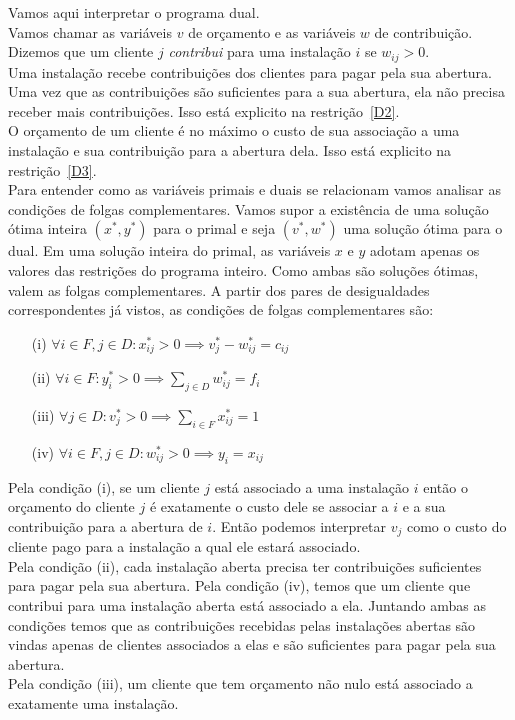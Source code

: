 \documentclass[12pt]{article}
\begin{document}
Vamos aqui interpretar o programa dual. \\ 
Vamos chamar as variáveis $v$ de orçamento e as variáveis $w$ de contribuição. Dizemos que um cliente $j$ \emph{contribui} para uma instalação $i$ se $w_{ij} > 0$.\\Uma instalação recebe contribuições dos clientes para pagar pela sua abertura. Uma vez que as contribuições são suficientes para a sua abertura, ela não precisa receber mais contribuições. Isso está explicito na restrição~\eqref{D2}.\\
O orçamento de um cliente é no máximo o custo de sua associação a uma instalação e sua contribuição para a abertura dela. Isso está explicito na restrição~\eqref{D3}.\\
Para entender como as variáveis primais e duais se relacionam vamos analisar as condições de folgas complementares. Vamos supor a existência de uma solução ótima inteira $(x^*,y^*)$ para o primal e seja $(v^*,w^*)$ uma solução ótima para o dual. Em uma solução inteira do primal, as variáveis $x$ e $y$ adotam apenas os valores das restrições do programa inteiro. Como ambas são soluções ótimas, valem as folgas complementares. A partir dos pares de desigualdades correspondentes já vistos, as condições de folgas complementares são:
\begin{enumerate}
    \item[(i)] $\forall i \in F, j \in D: x^*_{ij} > 0 \implies v^*_j - w^*_{ij} = c_{ij}$
    \item[(ii)]$\forall i \in F: y^*_i > 0 \implies \sum_{j \in D} w^*_{ij} = f_i$
    \item[(iii)]$\forall j \in D: v^*_j > 0 \implies \sum_{i \in F}x^*_{ij} = 1$
    \item[(iv)]$\forall i \in F, j \in D:w^*_{ij}>0 \implies y_i = x_{ij}$  
\end{enumerate}
Pela condição (i), se um cliente $j$ está associado a uma instalação $i$ então o orçamento do cliente $j$ é exatamente o custo dele se associar a $i$ e a sua contribuição para a abertura de $i$. Então podemos interpretar $v_j$ como o custo do cliente pago para a instalação a qual ele estará associado. \\
Pela condição (ii), cada instalação aberta precisa ter contribuições suficientes para pagar pela sua abertura. Pela condição (iv), temos que um cliente que contribui para uma instalação aberta está associado a ela. Juntando ambas as condições temos que as contribuições recebidas pelas instalações abertas são vindas apenas de clientes associados a elas e são suficientes para pagar pela sua abertura.\\
Pela condição (iii), um cliente que tem orçamento não nulo está associado a exatamente uma instalação.
\newpage
\end{document}
